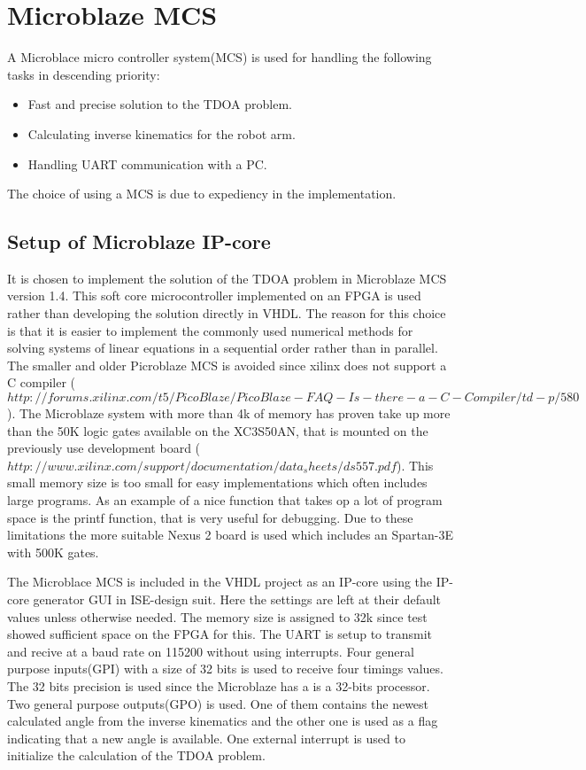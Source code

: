 \section{Microblaze MCS}
A Microblace micro controller system(MCS) is used for handling the following tasks in descending priority:
\begin{itemize}
	\item Fast and precise solution to the TDOA problem.
	\item Calculating inverse kinematics for the robot arm.
	\item Handling UART communication with a PC.
\end{itemize}
The choice of using a MCS is due to expediency in the implementation.

\subsection{Setup of Microblaze IP-core} 
It is chosen to implement the solution of the TDOA problem in Microblaze MCS version 1.4. This soft core microcontroller implemented on an FPGA is used rather than developing the solution directly in VHDL. 
The reason for this choice is that it is easier to implement the commonly used numerical methods for solving systems of linear equations in a sequential order rather than in parallel. 
The smaller and older Picroblaze MCS is avoided since xilinx does not support a C compiler  
($http://forums.xilinx.com/t5/PicoBlaze/PicoBlaze-FAQ-Is-there-a-C-Compiler/td-p/580$). 
The Microblaze system with more than 4k of memory has proven take up more than the 50K logic gates available on the XC3S50AN, that is mounted on the previously use development board ($http://www.xilinx.com/support/documentation/data_sheets/ds557.pdf$). 
This small memory size is too small for easy implementations which often includes large programs. As an example of a nice function that takes op a lot of program space is the printf function, that is very useful for debugging.
Due to these limitations the more suitable Nexus 2 board is used which includes an Spartan-3E with 500K gates.  

The Microblace MCS is included in the VHDL project as an IP-core using the IP-core generator GUI in ISE-design suit. Here the settings are left at their default values unless otherwise needed. The memory size is assigned to 32k since test showed sufficient space on the FPGA for this. The UART is setup to transmit and recive at a baud rate on 115200 without using interrupts. Four general purpose inputs(GPI) with a size of 32 bits is used to receive four timings values. The 32 bits precision is used since the Microblaze has a is a 32-bits processor. Two general purpose outputs(GPO) is used. One of them contains the newest calculated angle from the inverse kinematics and the other one is used as a flag indicating that a new angle is available. One external interrupt is used to initialize the calculation of the TDOA problem. 

